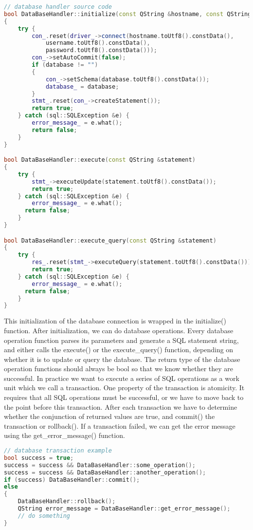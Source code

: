 \begin{lstlisting}[language=C++]
// database handler source code
bool DataBaseHandler::initialize(const QString &hostname, const QString &database, const QString& username, const QString& password)
{
    try {
        con_.reset(driver_->connect(hostname.toUtf8().constData(),
            username.toUtf8().constData(),
            password.toUtf8().constData()));
        con_->setAutoCommit(false);
        if (database != "")
        {
            con_->setSchema(database.toUtf8().constData());
            database_ = database;
        }
        stmt_.reset(con_->createStatement());
        return true;
    } catch (sql::SQLException &e) {
        error_message_ = e.what();
        return false;
    }
}

bool DataBaseHandler::execute(const QString &statement)
{
    try {
        stmt_->executeUpdate(statement.toUtf8().constData());
        return true;
    } catch (sql::SQLException &e) {
        error_message_ = e.what();
      return false;
    }
}

bool DataBaseHandler::execute_query(const QString &statement)
{
    try {
        res_.reset(stmt_->executeQuery(statement.toUtf8().constData()));
        return true;
    } catch (sql::SQLException &e) {
        error_message_ = e.what();
      return false;
    }
}
\end{lstlisting}

This initialization of the database connection is wrapped in the initialize() function. After initialization, we can do database operations. Every database operation function parses its parameters and generate a SQL statement string, and either calls the execute() or the execute\_query() function, depending on whether it is to update or query the database. The return type of the database operation functions should always be bool so that we know whether they are successful. In practice we want to execute a series of SQL operations as a work unit which we call a transaction. One property of the transaction is atomicity. It requires that all SQL operations must be successful, or we have to move back to the point before this transaction. After each transaction we have to determine whether the conjunction of returned values are true, and commit() the transaction or rollback(). If a transaction failed, we can get the error message using the get\_error\_message() function.

\begin{lstlisting}[language=C++]
// database transaction example
bool success = true;
success = success && DataBaseHandler::some_operation();
success = success && DataBaseHandler::another_operation();
if (success) DataBaseHandler::commit();
else
{
    DataBaseHandler::rollback();
    QString error_message = DataBaseHandler::get_error_message();
    // do something
}
\end{lstlisting}

